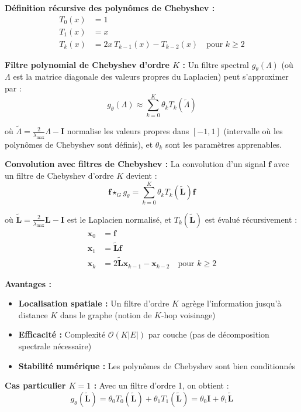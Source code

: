 \textbf{Définition récursive des polynômes de Chebyshev :}
\begin{align*}
T_0(x) &= 1 \\
T_1(x) &= x \\
T_k(x) &= 2x \, T_{k-1}(x) - T_{k-2}(x) \quad \text{pour } k \geq 2
\end{align*}

\textbf{Filtre polynomial de Chebyshev d'ordre $K$ :}
Un filtre spectral $g_\theta(\Lambda)$ (où $\Lambda$ est la matrice diagonale des valeurs propres du Laplacien) peut s'approximer par :
\[
g_\theta(\Lambda) \approx \sum_{k=0}^{K} \theta_k T_k(\tilde{\Lambda})
\]

où $\tilde{\Lambda} = \frac{2}{\lambda_{\max}}\Lambda - \mathbf{I}$ normalise les valeurs propres dans $[-1, 1]$ (intervalle où les polynômes de Chebyshev sont définis), et $\theta_k$ sont les paramètres apprenables.

\textbf{Convolution avec filtres de Chebyshev :}
La convolution d'un signal $\mathbf{f}$ avec un filtre de Chebyshev d'ordre $K$ devient :
\[
\mathbf{f} \star_G g_\theta = \sum_{k=0}^{K} \theta_k T_k(\tilde{\mathbf{L}}) \mathbf{f}
\]

où $\tilde{\mathbf{L}} = \frac{2}{\lambda_{\max}}\mathbf{L} - \mathbf{I}$ est le Laplacien normalisé, et $T_k(\tilde{\mathbf{L}})$ est évalué récursivement :
\begin{align*}
\mathbf{x}_0 &= \mathbf{f} \\
\mathbf{x}_1 &= \tilde{\mathbf{L}} \mathbf{f} \\
\mathbf{x}_k &= 2\tilde{\mathbf{L}} \mathbf{x}_{k-1} - \mathbf{x}_{k-2} \quad \text{pour } k \geq 2
\end{align*}

\textbf{Avantages :}
\begin{itemize}
    \item \textbf{Localisation spatiale :} Un filtre d'ordre $K$ agrège l'information jusqu'à distance $K$ dans le graphe (notion de $K$-hop voisinage)
    \item \textbf{Efficacité :} Complexité $\mathcal{O}(K|E|)$ par couche (pas de décomposition spectrale nécessaire)
    \item \textbf{Stabilité numérique :} Les polynômes de Chebyshev sont bien conditionnés
\end{itemize}

\textbf{Cas particulier $K=1$ :}
Avec un filtre d'ordre 1, on obtient :
\[
g_\theta(\tilde{\mathbf{L}}) = \theta_0 T_0(\tilde{\mathbf{L}}) + \theta_1 T_1(\tilde{\mathbf{L}}) = \theta_0 \mathbf{I} + \theta_1 \tilde{\mathbf{L}}
\]

